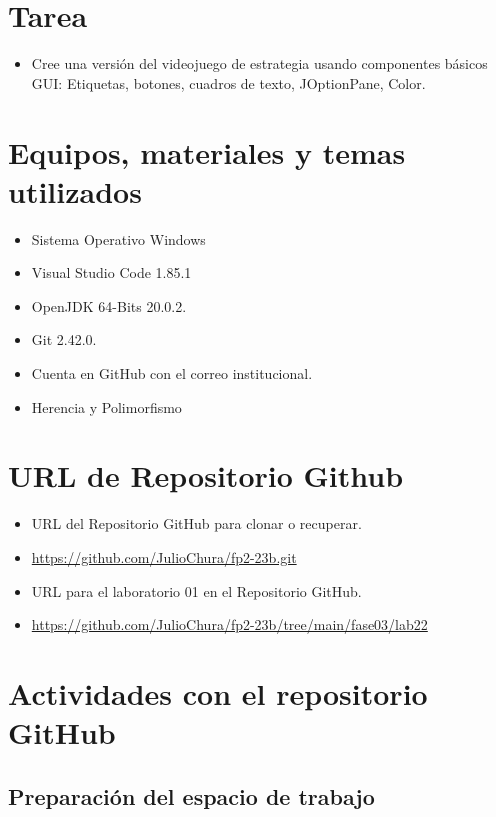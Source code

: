 \documentclass{article}
\begin{document}
	\section{Tarea}
	\begin{itemize}		
		\item Cree una versión del videojuego de estrategia usando componentes básicos GUI: Etiquetas, botones,
		cuadros de texto, JOptionPane, Color.
	\end{itemize}
	
	\section{Equipos, materiales y temas utilizados}
	\begin{itemize}
		\item Sistema Operativo Windows
		\item Visual Studio Code 1.85.1
		\item OpenJDK 64-Bits 20.0.2.
		\item Git 2.42.0.
		\item Cuenta en GitHub con el correo institucional.
		\item Herencia y Polimorfismo
	\end{itemize}
	
	\section{URL de Repositorio Github}
	\begin{itemize}
		\item URL del Repositorio GitHub para clonar o recuperar.
		\item \url{https://github.com/JulioChura/fp2-23b.git}
		\item URL para el laboratorio 01 en el Repositorio GitHub.
		\item \url{https://github.com/JulioChura/fp2-23b/tree/main/fase03/lab22}
	\end{itemize}
	
	\section{Actividades con el repositorio GitHub}
	
	
	
	
	
	
	
	\subsection{Preparación del espacio de trabajo}
	
\end{document}
